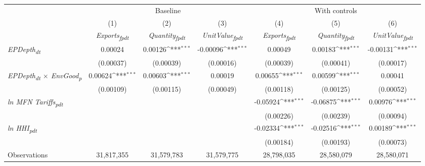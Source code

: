 {
\def\sym#1{\ifmmode^{#1}\else\(^{#1}\)\fi}
\begin{tabular}{l*{6}{c}}
\toprule
                &\multicolumn{3}{c}{Baseline}                            &\multicolumn{3}{c}{With controls}                       \\\cmidrule(lr){2-4}\cmidrule(lr){5-7}
                &\multicolumn{1}{c}{(1)}&\multicolumn{1}{c}{(2)}&\multicolumn{1}{c}{(3)}&\multicolumn{1}{c}{(4)}&\multicolumn{1}{c}{(5)}&\multicolumn{1}{c}{(6)}\\
                &\multicolumn{1}{c}{\textit{Exports\textsubscript{fpdt}}}&\multicolumn{1}{c}{\textit{Quantity\textsubscript{fpdt}}}&\multicolumn{1}{c}{\textit{UnitValue\textsubscript{fpdt}}}&\multicolumn{1}{c}{\textit{Exports\textsubscript{fpdt}}}&\multicolumn{1}{c}{\textit{Quantity\textsubscript{fpdt}}}&\multicolumn{1}{c}{\textit{UnitValue\textsubscript{fpdt}}}\\
\midrule
\textit{EPDepth\textsubscript{dt}}&  0.00024         &  0.00126\sym{***}& -0.00096\sym{***}&  0.00049         &  0.00183\sym{***}& -0.00131\sym{***}\\
                &(0.00037)         &(0.00039)         &(0.00016)         &(0.00039)         &(0.00041)         &(0.00017)         \\
\addlinespace
\textit{EPDepth\textsubscript{dt} $\times$ EnvGood\textsubscript{p}}&  0.00624\sym{***}&  0.00603\sym{***}&  0.00019         &  0.00655\sym{***}&  0.00599\sym{***}&  0.00041         \\
                &(0.00109)         &(0.00115)         &(0.00049)         &(0.00118)         &(0.00125)         &(0.00052)         \\
\addlinespace
\textit{ln MFN Tariffs\textsubscript{pdt}}&                  &                  &                  & -0.05924\sym{***}& -0.06875\sym{***}&  0.00976\sym{***}\\
                &                  &                  &                  &(0.00226)         &(0.00239)         &(0.00094)         \\
\addlinespace
\textit{ln HHI\textsubscript{pdt}}&                  &                  &                  & -0.02334\sym{***}& -0.02516\sym{***}&  0.00189\sym{***}\\
                &                  &                  &                  &(0.00184)         &(0.00193)         &(0.00073)         \\
\midrule
Observations    &31,817,355         &31,579,783         &31,579,775         &28,798,035         &28,580,079         &28,580,071         \\

\end{tabular}}
